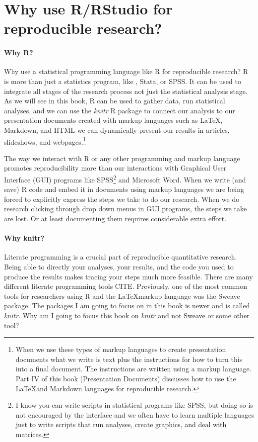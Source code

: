 \documentclass[ChapterTOCs,krantz1]{krantz}\usepackage{graphicx, color}
\begin{document}
\section{Why use R/RStudio for reproducible research?}

\paragraph{Why R?}
Why use a statistical programming language like R for reproducible research? R is more than just a statistics program, like , Stata, or SPSS. It can be used to integrate all stages of the research process not just the statistical analysis stage. As we will see in this book, R can be used to gather data, run statistical analyses, and we can use the {\emph{knitr}} R package to connect our analysis to our presentation documents created with markup languages such as \LaTeX, Markdown, and HTML we can dynamically present our results in articles, slideshows, and webpages.\footnote{When we use these types of markup languages to create presentation documents what we write is text plus the instructions for how to turn this into a final document. The instructions are written using a markup language. Part IV of this book (Presentation Documents) discusses how to use the \LaTeX and Markdown languages for reproducible research.} 

The way we interact with R or any other programming and markup language promotes reproducibility more than our interactions with Graphical User Interface (GUI) programs like SPSS\footnote{I know you can write scripts in statistical programs like SPSS, but doing so is not encouraged by the interface and we often have to learn multiple languages just to write scripts that run analyses, create graphics, and deal with matrices.} and Microsoft Word. When we write (and save) R code and embed it in documents using markup languages we are being forced to explicitly express the steps we take to do our research. When we do research clicking through drop down menus in GUI programs, the steps we take are lost. Or at least documenting them requires considerable extra effort.

\paragraph{Why knitr?}

Literate programming is a crucial part of reproducible quantitative research. Being able to directly your analyses, your results, and the code you used to produce the results makes tracing your steps much more feasible. There are many different literate programming tools CITE. Previously, one of the most common tools for researchers using R and the \LaTeX markup language was the Sweave package.\cite{Leisch2002} The packages I am going to focus on in this book is newer and is called {\emph{knitr}}.\cite{knitr} Why am I going to focus this book on {\emph{knitr}} and not Sweave or some other tool?
\end{document}
